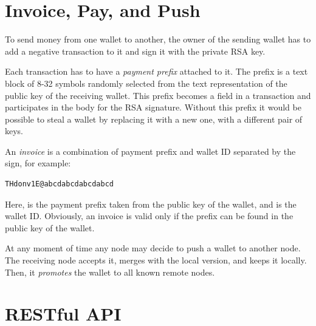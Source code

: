\documentclass{main}
\begin{document}
\section{Invoice, Pay, and Push}\label{sec:pay}

To send money from one wallet to another, the owner of the sending wallet
has to add a negative transaction to it and sign it with the private RSA key.

Each transaction has to have a \emph{payment prefix} attached to it.
The prefix is a text block of 8-32 symbols randomly selected from the
text representation of the public key of the receiving wallet. This prefix
becomes a field in a transaction and participates in the body for the RSA
signature. Without this prefix it would be possible to steal a wallet by
replacing it with a new one, with a different pair of keys.

An \emph{invoice} is a combination of payment prefix and wallet ID separated
by the  sign, for example:

\begin{verbatim}
THdonv1E@abcdabcdabcdabcd
\end{verbatim}

Here,  is the payment prefix taken from the public key of
the wallet, and  is the wallet ID. Obviously, an
invoice is valid only if the prefix can be found in the public key of the wallet.

At any moment of time any node may decide to push a wallet to another node.
The receiving node accepts it, merges with the local version, and keeps it locally.
Then, it \emph{promotes} the wallet to all known remote nodes.

\section{RESTful API}\label{sec:api}
\end{document}
